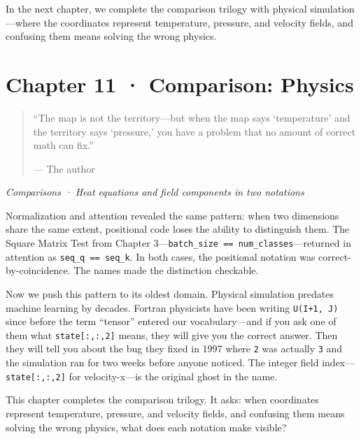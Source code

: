 \documentclass[11pt,titlepage]{article}
\begin{document}
In the next chapter, we complete the comparison trilogy with physical
simulation---where the coordinates represent temperature, pressure, and
velocity fields, and confusing them means solving the wrong physics.

\newpage

\hypertarget{chapter-11-comparison-physics}{%
\section{Chapter 11 · Comparison:
Physics}\label{chapter-11-comparison-physics}}

\begin{quote}
``The map is not the territory---but when the map says `temperature' and
the territory says `pressure,' you have a problem that no amount of
correct math can fix.''

--- The author
\end{quote}

\emph{Comparisons · Heat equations and field components in two
notations}

\vspace{2em}

Normalization and attention revealed the same pattern: when two
dimensions share the same extent, positional code loses the ability to
distinguish them. The Square Matrix Test from Chapter
3---\texttt{batch\_size\ ==\ num\_classes}---returned in attention as
\texttt{seq\_q\ ==\ seq\_k}. In both cases, the positional notation was
correct-by-coincidence. The names made the distinction checkable.

Now we push this pattern to its oldest domain. Physical simulation
predates machine learning by decades. Fortran physicists have been
writing \texttt{U(I+1,\ J)} since before the term ``tensor'' entered our
vocabulary---and if you ask one of them what \texttt{state{[}:,:,2{]}}
means, they will give you the correct answer. Then they will tell you
about the bug they fixed in 1997 where \texttt{2} was actually
\texttt{3} and the simulation ran for two weeks before anyone noticed.
The integer field index---\texttt{state{[}:,:,2{]}} for velocity-x---is
the original ghost in the name.

This chapter completes the comparison trilogy. It asks: when coordinates
represent temperature, pressure, and velocity fields, and confusing them
means solving the wrong physics, what does each notation make visible?

\vspace{2em}
\end{document}
